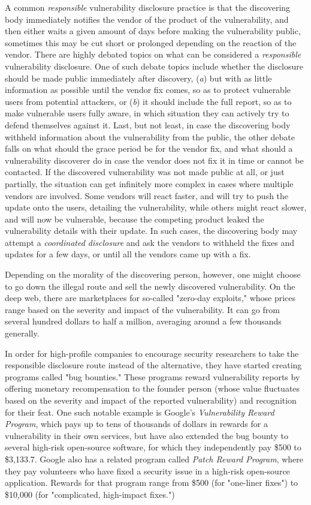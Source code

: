 \documentclass[a4paper,12pt]{article}
\begin{document}
	A common \textit{responsible} vulnerability disclosure practice is that the discovering body immediately notifies the vendor of the product of the vulnerability, and then either waits a given amount of days before making the vulnerability public, sometimes this may be cut short or prolonged depending on the reaction of the vendor. There are highly debated topics on what can be considered a \textit{responsible} vulnerability disclosure. One of such debate topics include whether the disclosure should be made public immediately after discovery, (\textit{a}) but with as little information as possible until the vendor fix comes, so as to protect vulnerable users from potential attackers, or (\textit{b}) it should include the full report, so as to make vulnerable users fully aware, in which situation they can actively try to defend themselves against it. Last, but not least, in case the discovering body withheld information about the vulnerability from the public, the other debate falls on what should the grace period be for the vendor fix, and what should a vulnerability discoverer do in case the vendor does not fix it in time or cannot be contacted. If the discovered vulnerability was not made public at all, or just partially, the situation can get infinitely more complex in cases where multiple vendors are involved. Some vendors will react faster, and will try to push the update onto the users, detailing the vulnerability, while others might react slower, and will now be vulnerable, because the competing product leaked the vulnerability details with their update. In such cases, the discovering body may attempt a \textit{coordinated disclosure} and ask the vendors to withheld the fixes and updates for a few days, or until all the vendors came up with a fix.
	
	Depending on the morality of the discovering person, however, one might choose to go down the illegal route and sell the newly discovered vulnerability. On the deep web, there are marketplaces for so-called "zero-day exploits," whose prices range based on the severity and impact of the vulnerability. It can go from several hundred dollars to half a million, averaging around a few thousands generally\cite{nperlroth13}.
	
	In order for high-profile companies to encourage security researchers to take the responsible disclosure route instead of the alternative, they have started creating programs called "bug bounties." These programs reward vulnerability reports by offering monetary recompensation to the founder person (whose value fluctuates based on the severity and impact of the reported vulnerability) and recognition for their feat. One such notable example is Google's \textit{Vulnerability Reward Program}\cite{googlevrp15}, which pays up to tens of thousands of dollars in rewards for a vulnerability in their own services, but have also extended the bug bounty to several high-risk open-source software, for which they independently pay \$500 to \$3,133.7. Google also has a related program called \textit{Patch Reward Program}, where they pay volunteers who have fixed a security issue in a high-risk open-source application. Rewards for that program range from \$500 (for "one-liner fixes") to \$10,000 (for "complicated, high-impact fixes.")
	
\end{document}
